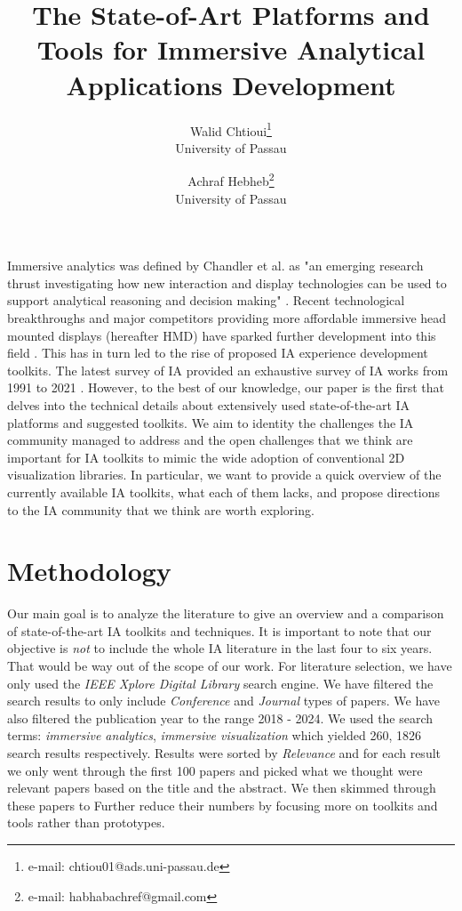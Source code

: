 \documentclass{vgtc}                          %
\title{The State-of-Art Platforms and Tools for Immersive Analytical
Applications Development}
\author{Walid Chtioui\thanks{e-mail: chtiou01@ads.uni-passau.de}\\ %
        \scriptsize University of Passau %
\and Achraf Hebheb\thanks{e-mail: habhabachref@gmail.com}\\ %
     \scriptsize University of Passau}
\begin{document}
\maketitle

Immersive analytics was defined by Chandler et al. as "an emerging research thrust investigating how new
interaction and display technologies can be used to support analytical reasoning and decision making"
\cite{ia}. Recent technological breakthroughs and major competitors providing more affordable immersive head
mounted displays (hereafter HMD) have sparked further development into this field
\cite{web:vision_pro_unity}. This has in turn led to the rise of proposed IA experience development toolkits.
The latest survey of IA provided an exhaustive survey of IA works from 1991 to 2021 \cite{survey_of_ia}.
However, to the best of our knowledge, our paper is the first that delves into the technical details about
extensively used state-of-the-art IA platforms and suggested toolkits. We aim to identity the challenges
the IA community managed to address and the open challenges that we think are important for IA toolkits
to mimic the wide adoption of conventional 2D visualization libraries. In particular, we want to provide
a quick overview of the currently available IA toolkits, what each of them lacks, and propose directions
to the IA community that we think are worth exploring.


\section{Methodology}

\noindent Our main goal is to analyze the literature to give an overview and a comparison of 
state-of-the-art IA toolkits and techniques. It is important to note that our objective is \textit{not} to
include the whole IA literature in the last four to six years. That would be way out of the scope of our
work. For literature selection, we have only used the \textit{IEEE Xplore Digital Library} search engine. We have filtered
the search results to only include \textit{Conference} and \textit{Journal} types of papers. We have also filtered
the publication year to the range 2018 - 2024. We used the search terms: \textit{immersive analytics},
\textit{immersive visualization} which yielded 260, 1826 search results respectively. Results were sorted by
\textit{Relevance} and for each result we only went through the first 100 papers and picked what we thought
were relevant papers based on the title and the abstract. We then skimmed through these papers to Further
reduce their numbers by focusing more on toolkits and tools rather than prototypes.
\end{document}
